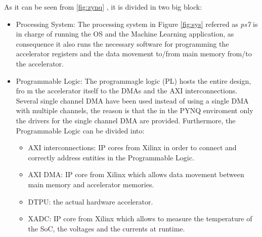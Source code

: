 As it can be seen from \ref{fig:zynq} , it is divided in two big block:
\begin{itemize}
\item Processing System:
The processing system in Figure \ref{fig:sys} referred as \textit{ps7} is in charge of running the OS and the Machine Learning application, as consequence it also runs the necessary software for programming the accelerator registers and the data movement to/from main memory from/to the accelerator.
\item Programmable Logic:
The programmagle logic (PL) hosts the entire design, fro m the accelerator itself to the DMAs and the AXI interconnections.\\ Several single channel DMA have been used instead of using a single DMA with multiple channels, the reason is that the in the PYNQ enviroment only the drivers for the single channel DMA are provided. Furthermore, the Programmable Logic can be divided into:
\begin{itemize}
\item AXI interconnections: IP cores from Xilinx\cite{paper:34}\cite{paper:35} in order to connect and correctly address entities in the Programmable Logic.
\item AXI DMA: IP core from Xilinx \cite{paper:33} which allows data movement between main memory and accelerator memories. 
\item DTPU: the actual hardware accelerator.
\item XADC: IP core from Xilinx \cite{paper:32} which allows to measure the temperature of the SoC, the voltages and the currents at runtime.

\end{itemize}

\end{itemize}

